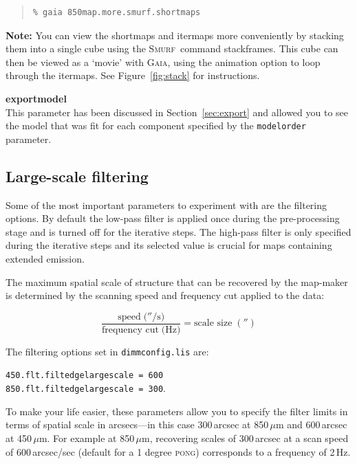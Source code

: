\documentclass[twoside,11pt]{article}
\newcommand{\htmlref}[2]{#1}
\newcommand{\latexhtml}[2]{#1}
\newcommand{\xref}[3]{#1}
\newcommand{\xlabel}[1]{}
\renewcommand{\_}{\texttt{\symbol{95}}}
\newenvironment{myquote}{\begin{quote}\begin{small}}{\end{small}\end{quote}}
\newcommand{\gaia}{\xref{\textsc{Gaia}}{sun214}{}}
\newcommand{\smurf}{\xref{\textsc{Smurf}}{sun258}{}}
\newcommand{\task}[1]{\textsf{#1}}
\newcommand{\stackframes}{\xref{\task{stackframes}}{sun258}{STACKFRAMES}}
\newcommand{\cref}[3]{\latexhtml{#1~\ref{#2}}{\htmlref{#3}{#2}}}
\begin{document}
\begin{myquote}
\begin{verbatim}
% gaia 850map.more.smurf.shortmaps
\end{verbatim}
\end{myquote}

\textbf{Note:} You can view the shortmaps and itermaps more
conveniently by stacking them into a single cube using the \smurf\
command \stackframes. This cube can then be viewed as a
`movie' with \gaia, using the animation option to loop through the
itermaps. See \cref{Figure}{fig:stack}{the box above} for instructions.

\textbf{exportmodel}\\
This parameter has been discussed in
\cref{Section}{sec:export}{Exporting individual models} and allowed
you to see the model that was fit for each component specified by the
\texttt{modelorder} parameter.

\subsection{\xlabel{filt}Large-scale filtering}
\label{sec:filt}

Some of the most important parameters to experiment with are the
filtering options. By default the low-pass filter is applied once
during the pre-processing stage and is turned off for the iterative
steps. The high-pass filter is only specified during the iterative
steps and its selected value is crucial for maps containing extended
emission.

The maximum spatial scale of structure that can be recovered by the
map-maker is determined by the scanning speed and frequency cut
applied to the data:

\begin{equation}
\frac{\mbox{speed}\;(''/\mbox{s)}}{\mbox{frequency cut}\;(\mbox{Hz)}}=\mbox{scale size}\;('')
\end{equation}

The filtering options set in \texttt{dimmconfig.lis} are:

\texttt{450.flt.filt\_edge\_largescale~=~600} \\
\texttt{850.flt.filt\_edge\_largescale~=~300}.

To make your life easier, these parameters allow you to specify the
filter limits in terms of spatial scale in arcsecs---in this case
300\,arcsec at 850\,$\mu$m and 600\,arcsec at 450\,$\mu$m. For example
at 850\,$\mu$m, recovering scales of 300\,arcsec at a scan speed of
600\,arcsec/sec (default for a 1 degree \textsc{pong}) corresponds to
a frequency of 2\,Hz.
\end{document}

